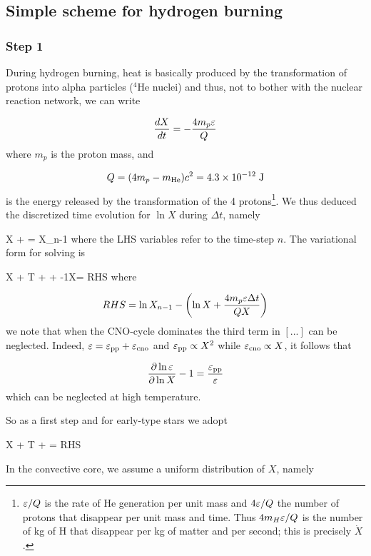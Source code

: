 \subsection{Simple scheme for hydrogen burning}

\subsubsection{Step 1}
During hydrogen burning, heat is basically produced by the transformation of
protons into alpha particles ($^4$He nuclei) and thus, not to bother with
the nuclear reaction network, we can write

\[ \frac{d X}{dt} = -\frac{4m_p\varepsilon}{Q}\]
where $m_p$ is the proton mass, and 

\[ Q= (4m_p-m_{\rm He})c^2 = 4.3\times10^{-12}\; {\rm J}\]
is the energy released by the transformation of the 4
protons\footnote{$\varepsilon/Q$ is the rate of He generation per unit mass and
$4\varepsilon/Q$ the number of protons that disappear per unit mass and time.
Thus $4m_H\varepsilon/Q$ is the number of kg of H that disappear per kg of
matter and per second; this is precisely $\dot{X}$.}. We thus deduced
the discretized time evolution for $\ln X$ during $\Delta t$, namely

\beq \ln X +  = \ln X_{n-1}
where the LHS variables refer to the time-step $n$. The variational form for
solving  is

\beq \delta\ln X + \lc
\lp{}\rp\delta\ln T +
\lp\frac{\partial\ln\eps}{\partial\ln\rho}\rp\delta\ln \rho +
\lp{}-1\rp\delta\ln X\rc = RHS
\eeq
where

\[ RHS = \ln X_{n-1} -\left(\ln X + \frac{4m_p\varepsilon\Delta t}{QX}\right)\]
we note that when the CNO-cycle dominates the third term in $[...]$ can be
neglected. Indeed, $\varepsilon = \varepsilon_{\rm pp}+\varepsilon_{\rm cno}$ and $\varepsilon_{\rm
pp}\propto X^2$ while $\varepsilon_{\rm cno}\propto X$, it follows that

\[ \frac{\partial\ln\varepsilon}{\partial\ln X}-1 = \frac{\varepsilon_{\rm pp}}{\varepsilon}\]
which can be neglected at high temperature.

So as a first step and for early-type stars we adopt

\beq
\delta\ln X + \lc
\lp{}\rp\delta\ln T +
\lp\frac{\partial\ln\eps}{\partial\ln\rho}\rp\delta\ln \rho
\rc = RHS
\eeq

In the convective core, we assume a uniform distribution of $X$, namely

